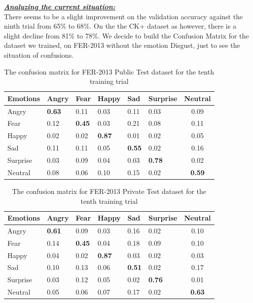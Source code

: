 \documentclass[runningheads,a4paper,11pt]{report}
\begin{document}
\clearpage
\underline{\textbf{\emph{Analyzing the current situation:}}}\\
There seems to be a slight improvement on the validation accuracy against the ninth trial from 65\% to 68\%. On the the CK+ dataset as however, there is a slight decline from 81\% to 78\%. We decide to build the Confusion Matrix for the dataset we trained, on FER-2013 without the emotion Disgust, just to see the situation of confusions.

\begin{table}[htbp]
	\caption{The confusion matrix for FER-2013 Public Test dataset for the tenth training trial}
	\label{fer_training_28k_01_mean_square_filtered_augmented_x6_confusion_matrix}
		\begin{center}
			\begin{tabular}{p{40pt}p{40pt}p{40pt}p{40pt}p{40pt}p{40pt}c}
				\textbf{Emotions}& \textbf{Angry}& \textbf{Fear}& \textbf{Happy}& \textbf{Sad}& \textbf{Surprise}& \textbf{Neutral} \\
				\hline\hline
				Angry& \textbf{0.63}& 0.11& 0.03& 0.11& 0.03& 0.09 \\
				Fear& 0.12& \textbf{0.45}& 0.03& 0.21& 0.08& 0.11 \\
				Happy& 0.02& 0.02& \textbf{0.87}& 0.01& 0.02& 0.05 \\
				Sad& 0.11& 0.11& 0.05& \textbf{0.55}& 0.02& 0.16 \\
				Surprise& 0.03& 0.09& 0.04& 0.03& \textbf{0.78}& 0.02 \\
				Neutral& 0.08& 0.06& 0.10& 0.15& 0.02& \textbf{0.59} \\
				\hline
			\end{tabular}
		\end{center}
\end{table}
\begin{table}[htbp]
	\caption{The confusion matrix for FER-2013 Private Test dataset for the tenth training trial}
	\label{fer_training_28k_01_mean_square_filtered_augmented_x6_confusion_matrix}
		\begin{center}
			\begin{tabular}{p{40pt}p{40pt}p{40pt}p{40pt}p{40pt}p{40pt}c}
				\textbf{Emotions}& \textbf{Angry}& \textbf{Fear}& \textbf{Happy}& \textbf{Sad}& \textbf{Surprise}& \textbf{Neutral} \\
				\hline\hline
				Angry& \textbf{0.61}& 0.09& 0.03& 0.16& 0.02& 0.10 \\
				Fear& 0.14& \textbf{0.45}& 0.04& 0.18& 0.09& 0.10 \\
				Happy& 0.04& 0.02& \textbf{0.87}& 0.03& 0.02& 0.03 \\
				Sad& 0.10& 0.13& 0.06& \textbf{0.51}& 0.02& 0.17 \\
				Surprise& 0.03& 0.12& 0.05& 0.02& \textbf{0.76}& 0.01 \\
				Neutral& 0.05& 0.06& 0.07& 0.17& 0.02& \textbf{0.63} \\
				\hline
			\end{tabular}
		\end{center}
\end{table}
\end{document}
